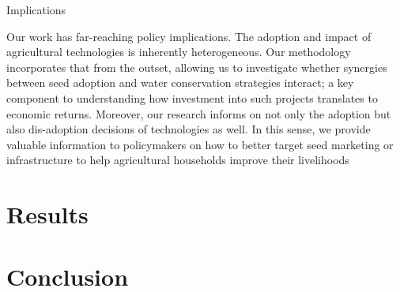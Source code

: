 \documentclass{article}
\begin{document}
Implications 

Our work has far-reaching policy implications. The adoption and impact of agricultural technologies is inherently heterogeneous. Our methodology incorporates that from the outset, allowing us to investigate whether synergies between seed adoption and water conservation strategies interact; a key component to understanding how investment into such projects translates to economic returns. Moreover, our research informs on not only the adoption but also dis-adoption decisions of technologies as well. In this sense, we provide valuable information to policymakers on how to better target seed marketing or infrastructure to help agricultural households improve their livelihoods

\section{Results}

\section{Conclusion}


\end{document}
